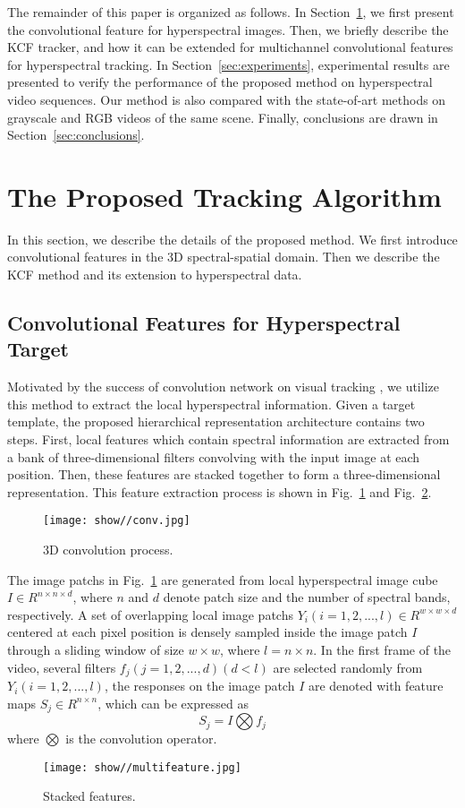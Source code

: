 \documentclass[runningheads,a4paper]{llncs}
\begin{document}
The remainder of this paper is organized as follows. In Section~\ref{sec:method}, we first present the convolutional feature for hyperspectral images. Then, we briefly describe the KCF tracker, and how it can be extended for multichannel convolutional features for hyperspectral tracking. In Section~\ref{sec:experiments}, experimental results are presented to verify the performance of the proposed method on hyperspectral video sequences. Our method is also compared with the state-of-art methods on grayscale and RGB videos of the same scene. Finally, conclusions are drawn in Section~\ref{sec:conclusions}.

\section{The Proposed Tracking Algorithm}\label{sec:method}
In this section, we describe the details of the proposed method. We first introduce convolutional features in the 3D spectral-spatial domain. Then we describe the KCF method and its extension to hyperspectral data.

\subsection{Convolutional Features for Hyperspectral Target}
Motivated by the success of convolution network on visual tracking \cite{CNT}, we utilize this method to extract the local hyperspectral information. Given a target template, the proposed hierarchical representation architecture contains two steps. First, local features which contain spectral information are extracted from a bank of three-dimensional filters convolving with the input image at each position. Then, these features are stacked together to form a three-dimensional representation. This feature extraction process is shown in Fig.~\ref{conv} and Fig.~\ref{stacking}.
\begin{figure}[htbp]
\centering
  \texttt{[image: show//conv.jpg]}
    \caption{3D convolution process. }\label{conv}
\end{figure}

The image patchs in Fig.~\ref{conv} are generated from local hyperspectral image cube $I \in R^{n \times n \times d}$, where $n$ and $d$ denote patch size and the number of spectral bands, respectively. A set of overlapping local image patchs $Y_i (i=1,2,...,l)\in R^{w \times w \times d}$ centered at each pixel position is densely sampled inside the image patch $I$ through a sliding window of size $w \times w$, where $l=n \times n$. In the first frame of the video, several filters $f_j(j=1,2,...,d)(d<l)$ are selected randomly from $Y_i (i=1,2,...,l)$, the responses on the image patch $I$ are denoted with feature maps $S_j \in R^{n \times n}$, which can be expressed as
\begin{equation}\label{1}
S_j=I \bigotimes f_j
\end{equation}
where $\bigotimes$ is the convolution operator.
\begin{figure}[htbp]
\centering
  \texttt{[image: show//multifeature.jpg]}
    \caption{Stacked features. }\label{stacking}
\end{figure}
\end{document}
